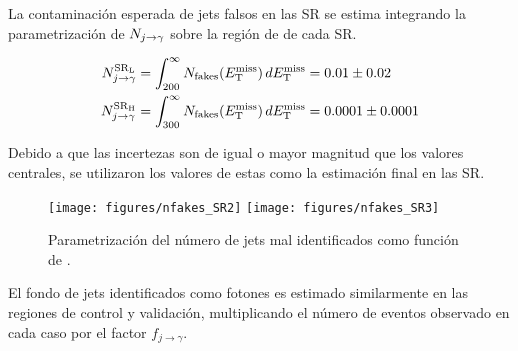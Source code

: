 La contaminación esperada de jets falsos en las SR se estima integrando la
parametrización de $N_{j\rightarrow\gamma}$ sobre la región de {\met} de cada SR.

\begin{align}
  N_{j\rightarrow\gamma}^\text{\ensuremath{\mathrm{SR}_\mathrm{L}}} &= \int_{200}^{\infty} N_\text{fakes}(E_{\mathrm{T}}^{\mathrm{miss}}) \, dE_{\mathrm{T}}^{\mathrm{miss}} = 0.01 \pm 0.02 \\
  N_{j\rightarrow\gamma}^\text{\ensuremath{\mathrm{SR}_\mathrm{H}}} &= \int_{300}^{\infty} N_\text{fakes}(E_{\mathrm{T}}^{\mathrm{miss}}) \, dE_{\mathrm{T}}^{\mathrm{miss}} = 0.0001 \pm 0.0001
\end{align}

Debido a que las incertezas son de igual o mayor magnitud que los valores centrales,
se utilizaron los valores de estas como la estimación final en las SR.


\begin{figure}[!htbp]
  \centering
  \texttt{[image: figures/nfakes\_SR2]}  \hfill
  \texttt{[image: figures/nfakes\_SR3]}
  \caption{Parametrización del número de jets mal identificados como
    función de {\met}.}
  \label{fig:jetfake_nfakes_met}
\end{figure}

El fondo de jets identificados como fotones es estimado similarmente en las
regiones de control y validación,
multiplicando el número de eventos observado en cada caso por el factor
$f_{j\to\gamma}$.









